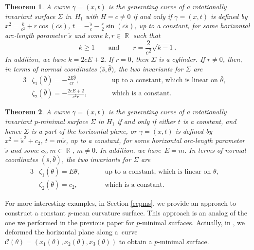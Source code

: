 \documentclass[pdftex]{sigma}
\numberwithin{equation}{section}
\newtheorem{theoremA}{Theorem}
\DeclareMathOperator{\R}{\mathbb R}
\begin{document}
\begin{theoremA}\label{TheoremA}
A curve $\gamma=(x,t)$ is the generating curve of a rotationally invariant surface $\Sigma$ in~$H_{1}$ with $H=c\neq 0$
if and only if $\gamma=(x,t)$ is defined by
$x^{2}=\frac{k}{c^2}+r\cos{(c\tilde{s})}$, $t=-\frac{\tilde{s}}{c}-\frac{r}{2}\sin{(c\tilde{s})}$, up to a constant,
for some horizontal arc-length parameter $\tilde{s}$ and some $k, r\in\R$ such that
\begin{equation*}
k\geq 1\qquad \textrm{and}\qquad r=\frac{2}{c^2}\sqrt{k-1}.
\end{equation*} In addition, we have
$k=2cE+2$. If $r=0$, then $\Sigma$ is a cylinder. If $r\neq 0$, then, in terms of normal coordinates $\bigl(\bar s,\bar\theta\bigr)$, the two invariants for $\Sigma$ are
\begin{alignat*}{3}
&\zeta_{1}(\bar{\theta})=-\frac{2E\bar\theta}{cr},\qquad && \textrm{up to a constant, which is linear on $\bar\theta$}, &\\
& \zeta_{2}(\bar{\theta})=-\frac{2cE+2}{c^{2}r},\qquad&& \textrm{which is a constant}.&
\end{alignat*}
\end{theoremA}
\begin{theoremA}\label{TheoremB}
A curve $\gamma=(x,t)$ is the generating curve of a rotationally invariant $p$-minimal surface $\Sigma$ in $H_{1}$ if and only if either $t$ is a constant, and hence $\Sigma$ is a part of the horizontal plane, or $\gamma=(x,t)$ is defined by
$
x^{2}=\tilde{s}^{2}+c_2$, $
t=m\tilde{s}$, up to a constant,
for some horizontal arc-length parameter $\tilde{s}$ and some $c_2, m\in\R,\ m\neq 0$. In addition, we have~${
E=m}$.
In terms of normal coordinates $(\bar s,\bar\theta)$, the two invariants for $\Sigma$ are
\begin{alignat*}{3}
& \zeta_{1}(\bar{\theta})=E\bar\theta,\qquad && \textrm{up to a constant, which is linear on $\bar\theta$},& \\
&\zeta_{2}(\bar{\theta})=c_{2},\qquad && \textrm{which is a constant}.&
\end{alignat*}
\end{theoremA}
For more interesting examples, in Section \ref{ccpms}, we provide an approach to construct a constant $p$-mean curvature surface. This approach is an analog of the one we performed in the previous paper \cite{ChiuH/LiuH:2022} for $p$-minimal surfaces. Actually, in \cite{ChiuH/LiuH:2022}, we deformed the horizontal plane along a~curve~${\mathcal{C}(\theta)=(x_{1}(\theta), x_{2}(\theta), x_{3}(\theta))}$ to obtain a $p$-minimal surface.
\end{document}
